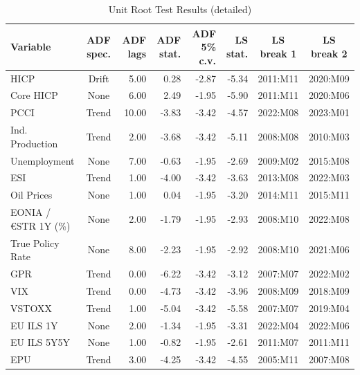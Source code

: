 \begin{table}[ht]
\centering
\begin{tabular}{lcrrrrcc}
  \hline
Variable & ADF spec. & ADF lags & ADF stat. & ADF 5\% c.v. & LS stat. & LS break 1 & LS break 2 \\ 
  \hline
HICP & Drift & 5.00 & 0.28 & -2.87 & -5.34 & 2011:M11 & 2020:M09 \\ 
  Core HICP & None & 6.00 & 2.49 & -1.95 & -5.90 & 2011:M11 & 2020:M06 \\ 
  PCCI & Trend & 10.00 & -3.83 & -3.42 & -4.57 & 2022:M08 & 2023:M01 \\ 
  Ind. Production & Trend & 2.00 & -3.68 & -3.42 & -5.11 & 2008:M08 & 2010:M03 \\ 
  Unemployment & None & 7.00 & -0.63 & -1.95 & -2.69 & 2009:M02 & 2015:M08 \\ 
  ESI & Trend & 1.00 & -4.00 & -3.42 & -3.63 & 2013:M08 & 2022:M03 \\ 
  Oil Prices & None & 1.00 & 0.04 & -1.95 & -3.20 & 2014:M11 & 2015:M11 \\ 
  EONIA / €STR 1Y (\%) & None & 2.00 & -1.79 & -1.95 & -2.93 & 2008:M10 & 2022:M08 \\ 
  True Policy Rate & None & 8.00 & -2.23 & -1.95 & -2.92 & 2008:M10 & 2021:M06 \\ 
  GPR & Trend & 0.00 & -6.22 & -3.42 & -3.12 & 2007:M07 & 2022:M02 \\ 
  VIX & Trend & 0.00 & -4.73 & -3.42 & -3.96 & 2008:M09 & 2018:M09 \\ 
  VSTOXX & Trend & 1.00 & -5.04 & -3.42 & -5.58 & 2007:M07 & 2019:M04 \\ 
  EU ILS 1Y & None & 2.00 & -1.34 & -1.95 & -3.31 & 2022:M04 & 2022:M06 \\ 
  EU ILS 5Y5Y & None & 1.00 & -0.82 & -1.95 & -2.61 & 2011:M07 & 2011:M11 \\ 
  EPU & Trend & 3.00 & -4.25 & -3.42 & -4.55 & 2005:M11 & 2007:M08 \\ 
   \hline
\end{tabular}
\caption{Unit Root Test Results (detailed)} 
\label{tab:unit_roots_detailed}
\end{table}
